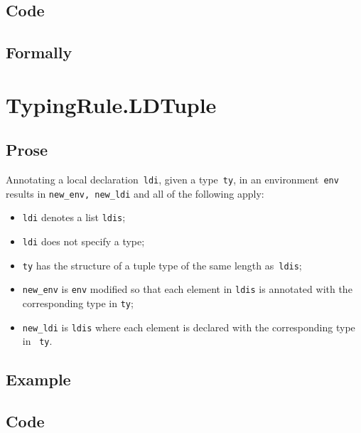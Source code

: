 \documentclass{book}
\begin{document}
  \subsection{Code}

\begin{emptyformal}
    \subsection{Formally}
\end{emptyformal}


\section{TypingRule.LDTuple \label{sec:TypingRule.LDTuple}}

  \subsection{Prose}
    Annotating a local declaration~\texttt{ldi}, given a type~\texttt{ty}, in
an environment~\texttt{env} results in \texttt{new\_env, new\_ldi} and all of
the following apply:
  \begin{itemize}
  \item \texttt{ldi} denotes a list \texttt{ldis};
  \item \texttt{ldi} does not specify a type;
  \item \texttt{ty} has the structure of a tuple type of the same length as~\texttt{ldis};
  \item \texttt{new\_env} is \texttt{env} modified so that each element in \texttt{ldis} is annotated with the corresponding type in \texttt{ty};
  \item \texttt{new\_ldi} is \texttt{ldis} where each element is declared with
the corresponding type in ~\texttt{ty}.
  \end{itemize}

  \subsection{Example}

  \subsection{Code}
\end{document}
